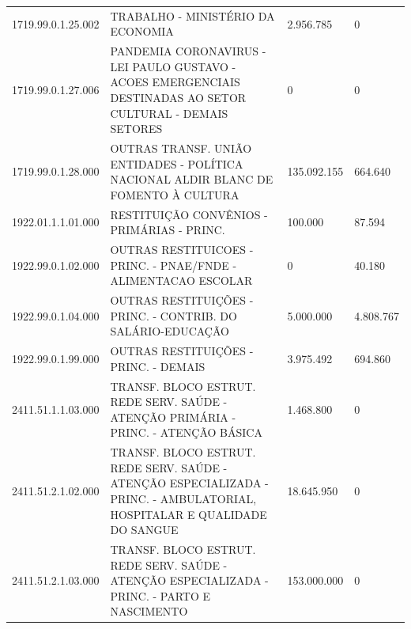 \documentclass{article}
\begin{document}
\begin{longtable}[c]{m{2cm}|m{11cm}|m{2cm}m{2cm}}
\multicolumn{1}{C{2cm}|}{1719.99.0.1.25.002} & \multicolumn{1}{L{11cm}|}{TRABALHO - MINISTÉRIO DA ECONOMIA} & \multicolumn{1}{R{2cm}|}{2.956.785} & \multicolumn{1}{R{2cm}}{            0} \\
\multicolumn{1}{C{2cm}|}{1719.99.0.1.27.006} & \multicolumn{1}{L{11cm}|}{PANDEMIA CORONAVIRUS - LEI PAULO GUSTAVO - ACOES EMERGENCIAIS DESTINADAS AO SETOR CULTURAL - DEMAIS SETORES} & \multicolumn{1}{R{2cm}|}{            0} & \multicolumn{1}{R{2cm}}{            0} \\
\multicolumn{1}{C{2cm}|}{1719.99.0.1.28.000} & \multicolumn{1}{L{11cm}|}{OUTRAS TRANSF. UNIÃO ENTIDADES - POLÍTICA NACIONAL ALDIR BLANC DE FOMENTO À CULTURA} & \multicolumn{1}{R{2cm}|}{135.092.155} & \multicolumn{1}{R{2cm}}{664.640} \\
\multicolumn{1}{C{2cm}|}{1922.01.1.1.01.000} & \multicolumn{1}{L{11cm}|}{RESTITUIÇÃO CONVÊNIOS - PRIMÁRIAS - PRINC.} & \multicolumn{1}{R{2cm}|}{100.000} & \multicolumn{1}{R{2cm}}{87.594} \\
\multicolumn{1}{C{2cm}|}{1922.99.0.1.02.000} & \multicolumn{1}{L{11cm}|}{OUTRAS RESTITUICOES - PRINC. - PNAE/FNDE - ALIMENTACAO ESCOLAR} & \multicolumn{1}{R{2cm}|}{            0} & \multicolumn{1}{R{2cm}}{40.180} \\
\multicolumn{1}{C{2cm}|}{1922.99.0.1.04.000} & \multicolumn{1}{L{11cm}|}{OUTRAS RESTITUIÇÕES - PRINC. - CONTRIB. DO SALÁRIO-EDUCAÇÃO} & \multicolumn{1}{R{2cm}|}{5.000.000} & \multicolumn{1}{R{2cm}}{4.808.767} \\
\multicolumn{1}{C{2cm}|}{1922.99.0.1.99.000} & \multicolumn{1}{L{11cm}|}{OUTRAS RESTITUIÇÕES - PRINC. - DEMAIS} & \multicolumn{1}{R{2cm}|}{3.975.492} & \multicolumn{1}{R{2cm}}{694.860} \\
\multicolumn{1}{C{2cm}|}{2411.51.1.1.03.000} & \multicolumn{1}{L{11cm}|}{TRANSF. BLOCO ESTRUT. REDE SERV. SAÚDE - ATENÇÃO PRIMÁRIA - PRINC. - ATENÇÃO BÁSICA} & \multicolumn{1}{R{2cm}|}{1.468.800} & \multicolumn{1}{R{2cm}}{            0} \\
\multicolumn{1}{C{2cm}|}{2411.51.2.1.02.000} & \multicolumn{1}{L{11cm}|}{TRANSF. BLOCO ESTRUT. REDE SERV. SAÚDE - ATENÇÃO ESPECIALIZADA - PRINC. - AMBULATORIAL, HOSPITALAR E QUALIDADE DO SANGUE} & \multicolumn{1}{R{2cm}|}{18.645.950} & \multicolumn{1}{R{2cm}}{            0} \\
\multicolumn{1}{C{2cm}|}{2411.51.2.1.03.000} & \multicolumn{1}{L{11cm}|}{TRANSF. BLOCO ESTRUT. REDE SERV. SAÚDE - ATENÇÃO ESPECIALIZADA - PRINC. - PARTO E NASCIMENTO} & \multicolumn{1}{R{2cm}|}{153.000.000} & \multicolumn{1}{R{2cm}}{            0} \\

\end{longtable}
\end{document}
